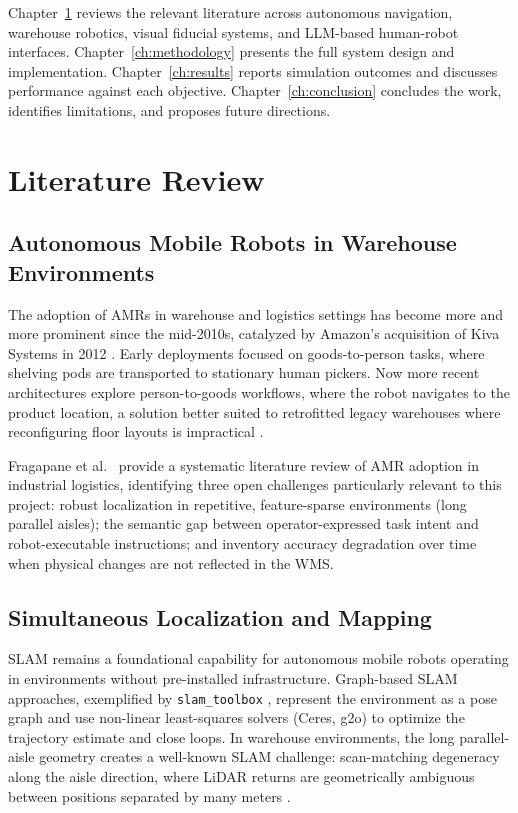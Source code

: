 \documentclass[12pt,a4paper]{report}
\begin{document}
Chapter~\ref{ch:litreview} reviews the relevant literature across autonomous navigation, warehouse robotics, visual fiducial systems, and LLM-based human-robot interfaces. Chapter~\ref{ch:methodology} presents the full system design and implementation. Chapter~\ref{ch:results} reports simulation outcomes and discusses performance against each objective. Chapter~\ref{ch:conclusion} concludes the work, identifies limitations, and proposes future directions.

\chapter{Literature Review}
\label{ch:litreview}

\section{Autonomous Mobile Robots in Warehouse Environments}

The adoption of AMRs in warehouse and logistics settings has become more and more prominent since the mid-2010s, catalyzed by Amazon's acquisition of Kiva Systems in 2012 \citep{guizzo2012}. Early deployments focused on goods-to-person tasks, where shelving pods are transported to stationary human pickers. Now more recent architectures explore person-to-goods workflows, where the robot navigates to the product location, a solution better suited to retrofitted legacy warehouses where reconfiguring floor layouts is impractical \citep{wurman2008}.

Fragapane et al.\ \citep{fragapane2021} provide a systematic literature review of AMR adoption in industrial logistics, identifying three open challenges particularly relevant to this project: robust localization in repetitive, feature-sparse environments (long parallel aisles); the semantic gap between operator-expressed task intent and robot-executable instructions; and inventory accuracy degradation over time when physical changes are not reflected in the WMS.

\section{Simultaneous Localization and Mapping}

SLAM remains a foundational capability for autonomous mobile robots operating in environments without pre-installed infrastructure. Graph-based SLAM approaches, exemplified by \texttt{slam\_toolbox} \citep{macenski2021}, represent the environment as a pose graph and use non-linear least-squares solvers (Ceres, g2o) to optimize the trajectory estimate and close loops. In warehouse environments, the long parallel-aisle geometry creates a well-known SLAM challenge: scan-matching degeneracy along the aisle direction, where LiDAR returns are geometrically ambiguous between positions separated by many meters \citep{cadena2016}.
\end{document}
